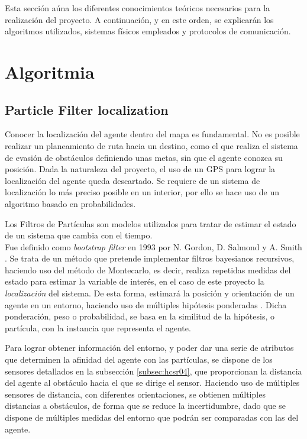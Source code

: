 

Esta sección aúna los diferentes conocimientos teóricos necesarios para la realización del proyecto. A continuación, y en este orden, se explicarán los algoritmos utilizados, sistemas físicos empleados y  protocolos de comunicación.

\section{Algoritmia}


\subsection{Particle Filter localization}
\label{subsec:PF}

Conocer la localización del agente dentro del mapa es fundamental. No es posible realizar un planeamiento de ruta hacia un destino, como el que realiza el sistema de evasión de obstáculos definiendo unas metas, sin que el agente conozca su posición.
Dada la naturaleza del proyecto, el uso de un GPS para lograr la localización del agente queda descartado. Se requiere de un sistema de localización lo más preciso posible en un interior, por ello se hace uso de un algoritmo basado en probabilidades. 

Los Filtros de Partículas son modelos utilizados para tratar de estimar el estado de un sistema que cambia con el tiempo. 
\\Fue definido como \textit{bootstrap filter} en 1993 por N. Gordon, D. Salmond y A. Smith \citep{art:GSSPF}.  Se trata de un método que pretende implementar filtros bayesianos recursivos, haciendo uso del método de Montecarlo, es decir, realiza repetidas medidas del estado para estimar la variable de interés, en el caso de este proyecto la \emph{localización} del sistema. De esta forma, estimará la posición y orientación de un agente en un entorno, haciendo uso de múltiples hipótesis ponderadas \citep{art:PFTuto}.
Dicha ponderación, peso o probabilidad, se basa en la similitud de la hipótesis, o partícula, con la instancia que representa el agente. 

Para lograr obtener información del entorno, y poder dar una serie de atributos que determinen la afinidad del agente con las partículas, se dispone de los sensores detallados en la subsección \ref{subsec:hcsr04}, que proporcionan la distancia del agente al obstáculo hacia el que se dirige el sensor. 
Haciendo uso de múltiples sensores de distancia, con diferentes orientaciones, se obtienen múltiples distancias a obstáculos, de forma que se reduce la incertidumbre, dado que se dispone de múltiples medidas del entorno que podrán ser comparadas con las del agente. 


